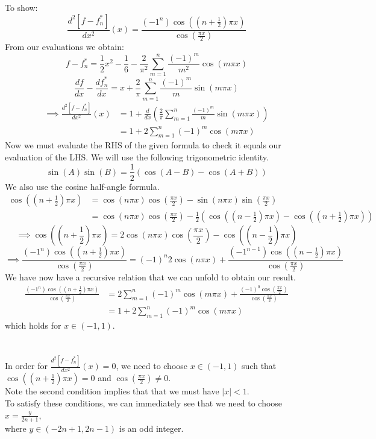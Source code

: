 \documentclass[12pt]{article}
\begin{document}
To show:
$$
\frac{d^2[f-f_n^*]}{dx^2}(x) = 
\frac{(-1^n)\cos\left(\left(n+\frac{1}{2}\right)\pi x\right)}
{\cos\left(\frac{\pi x}{2}\right)}
$$
From our evaluations we obtain:
$$
f-f_n^*=\frac{1}{2}x^2 - \frac{1}{6} - \frac{2}{\pi^2}
\sum_{m=1}^n\frac{(-1)^m}{m^2}\cos(m\pi x)
$$
$$
\frac{df}{dx}-\frac{df_n^*}{dx}=x+\frac{2}{\pi}
\sum_{m=1}^n\frac{(-1)^m}{m}\sin(m\pi x)
$$
\begin{align*}
\implies
\frac{d^2[f-f_n^*]}{dx^2}(x) &= 
1 + \frac{d}{dx}\left(\frac{2}{\pi}
\sum_{m=1}^n\frac{(-1)^m}{m}\sin(m\pi x)\right) \\&=
1 + 2\sum_{m=1}^n(-1)^m\cos(m\pi x)
\end{align*}
Now we must evaluate the RHS of the given formula to check it equals our evaluation of the LHS.
We will use the following trigonometric identity.
$$
\sin(A)\sin(B) = \frac{1}{2}(\cos(A-B) - \cos(A+B))
$$
We also use the cosine half-angle formula.
\begin{align*}
\cos((n+\frac{1}{2})\pi x) &=
\cos(n\pi x)\cos(\frac{\pi x}{2}) -
\sin(n\pi x)\sin(\frac{\pi x}{2}) \\&=
\cos(n\pi x)\cos(\frac{\pi x}{2}) -
\frac{1}{2}(\cos((n-\frac{1}{2})\pi x)-
\cos((n+\frac{1}{2})\pi x))
\end{align*}
$$
\implies
\cos((n+\frac{1}{2})\pi x) =
2\cos(n\pi x)\cos(\frac{\pi x}{2}) -
\cos((n-\frac{1}{2})\pi x)
$$
$$
\implies
\frac{(-1^n)\cos\left(\left(n+\frac{1}{2}\right)\pi x\right)}
{\cos\left(\frac{\pi x}{2}\right)} =
(-1)^n2\cos(n\pi x) +
\frac{(-1^{n-1})\cos\left(\left(n-\frac{1}{2}\right)\pi x\right)}
{\cos\left(\frac{\pi x}{2}\right)}
$$
We have now have a recursive relation that we can unfold to obtain our result.
\begin{align*}
\frac{(-1^n)\cos\left(\left(n+\frac{1}{2}\right)\pi x\right)}
{\cos\left(\frac{\pi x}{2}\right)} &=
2\sum_{m=1}^n(-1)^m\cos(m\pi x) +
\frac{(-1)^0\cos\left(\frac{\pi x}{2}\right)}
{\cos\left(\frac{\pi x}{2}\right)} \\&=
1 + 2\sum_{m=1}^n(-1)^m\cos(m\pi x)
\end{align*}
which holds for $x\in(-1,1)$.

\section{}

In order for $\frac{d^2[f-f_n^*]}{dx^2}(x)=0$, we need to choose $x\in(-1,1)$ such that
\\$\cos((n+\frac{1}{2})\pi x)=0$ and $\cos(\frac{\pi x}{2})\neq0$. 
\\Note the second condition implies that that we must have $|x|<1$.
\\To satisfy these conditions, we can immediately see that we need to choose $x=\frac{y}{2n+1}$,\\ where $y\in(-2n+1, 2n-1)$ is an odd integer.
\end{document}
